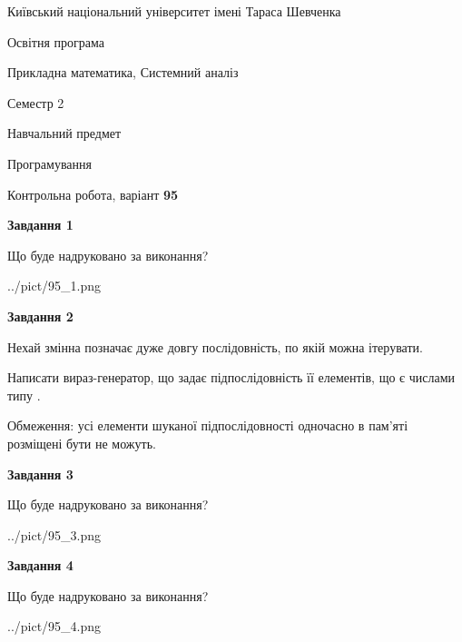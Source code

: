 \documentclass[12pt, ukrainian]{article}
\begin{document}
{{\begin {small}\par
{ \center  Київський національний університет імені Тараса Шевченка \par}
{\parbox {5 cm}{Освітня програма \hfill}{\parbox {8 cm}{Прикладна математика, Системний аналіз \hfill}}\parbox {5 cm}{\hfill Семестр 2}}\par
{\parbox {5 cm} {Навчальний предмет \hfill}\parbox {7 cm}{Програмування \hfill}\parbox {6cm}{\hfill}\par}\vspace{-7pt} \end{small}}{\center Контрольна робота, варіант  \No \textbf
{ 95 }\par}}
{
\begin {large}
{\begin {center}\textbf{Завдання 1}\end {center}}\par
Що буде надруковано за виконання?\par\par
\begin{center}
	{../pict/95_1.png}
\end{center}
\newpage

{\begin {center}\textbf{Завдання 2}\end {center}}\par
Нехай змінна  позначає дуже довгу послідовність, по якій можна ітерувати.

Написати вираз-генератор, що задає підпослідовність її елементів, що є числами типу .

Обмеження: усі елементи шуканої підпослідовності одночасно в пам'яті розміщені бути не можуть.\par
\newpage

{\begin {center}\textbf{Завдання 3}\end {center}}\par
Що буде надруковано за виконання?\par
\begin{center}
	{../pict/95_3.png}
\end{center}
\newpage

{\begin {center}\textbf{Завдання 4}\end {center}}\par
Що буде надруковано за виконання?\par
\begin{center}
	{../pict/95_4.png}
\end{center}
\newpage


\end{large}}
\end{document}
